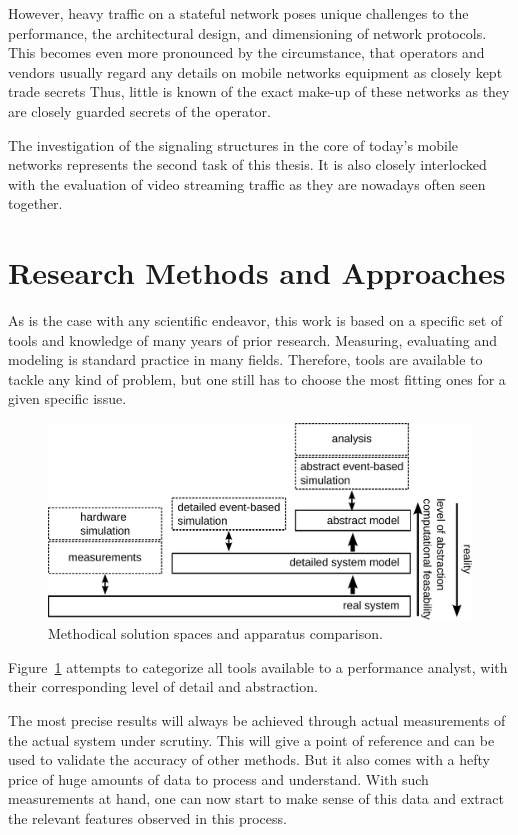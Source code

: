However, heavy traffic on a stateful network poses unique challenges to the performance, the architectural design, and dimensioning of network protocols. This becomes even more pronounced by the circumstance, that operators and vendors usually regard any details on mobile networks equipment as closely kept trade secrets Thus, little is known of the exact make-up of these networks as they are closely guarded secrets of the operator.

The investigation of the signaling structures in the core of today's mobile networks represents the second task of this thesis. It is also closely interlocked with the evaluation of video streaming traffic as they are nowadays often seen together.


\section{Research Methods and Approaches}

As is the case with any scientific endeavor, this work is based on a specific set of tools and knowledge of many years of prior research. Measuring, evaluating and modeling is standard practice in many fields. Therefore, tools are available to tackle any kind of problem, but one still has to choose the most fitting ones for a given specific issue.

\begin{figure}[htb]
	\centering
	\includegraphics[width=1.0\textwidth]{images/apparatus.pdf}
	\caption{Methodical solution spaces and apparatus comparison.}
\label{c1:fig:appcomp}
\end{figure}

Figure~\ref{c1:fig:appcomp} attempts to categorize all tools available to a performance analyst, with their corresponding level of detail and abstraction.

The most precise results will always be achieved through actual measurements of the actual system under scrutiny. This will give a point of reference and can be used to validate the accuracy of other methods. But it also comes with a hefty price of huge amounts of data to process and understand. With such measurements at hand, one can now start to make sense of this data and extract the relevant features observed in this process.


